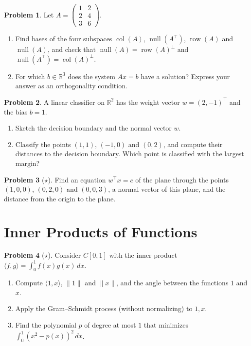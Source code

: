 \documentclass[11pt]{article}
\theoremstyle{definition}
\newtheorem{problem}{Problem}[section]
\newcommand{\norm}[1]{\lVert #1 \rVert}
\newcommand{\ip}[2]{\langle #1, #2 \rangle}
\DeclareMathOperator{\Null}{null}
\DeclareMathOperator{\col}{col}
\DeclareMathOperator{\row}{row}
\begin{document}
\begin{problem}\label{pr:four-subspaces}
    Let $A = \begin{pmatrix} 1 & 2 \\ 2 & 4 \\ 3 & 6 \end{pmatrix}$.
    \begin{enumerate}[label=(\alph*)]
        \item Find bases of the four subspaces $\col(A)$, $\Null(A^\top)$, $\row(A)$ and $\Null(A)$, and check that $\Null(A) = \row(A)^\perp$ and $\Null(A^\top) = \col(A)^\perp$.
        \item For which $b \in \mathbb{R}^3$ does the system $Ax = b$ have a solution? Express your answer as an orthogonality condition.
    \end{enumerate}
\end{problem}

\begin{problem}\label{pr:classifier}
    A linear classifier on $\mathbb{R}^2$ has the weight vector $w = (2, -1)^\top$ and the bias $b = 1$.
    \begin{enumerate}[label=(\alph*)]
        \item Sketch the decision boundary and the normal vector $w$.
        \item Classify the points $(1, 1)$, $(-1, 0)$ and $(0, 2)$, and compute their distances to the decision boundary. Which point is classified with the largest margin?
    \end{enumerate}
\end{problem}

\begin{problem}[$\star$]\label{pr:hyperplane-form}
    Find an equation $w^\top x = c$ of the plane through the points $(1, 0, 0)$, $(0, 2, 0)$ and $(0, 0, 3)$, a normal vector of this plane, and the distance from the origin to the plane.
\end{problem}

\section{Inner Products of Functions}

\begin{problem}[$\star$]\label{pr:func-ip}
    Consider $C[0, 1]$ with the inner product $\ip{f}{g} = \int_0^1 f(x) g(x) \, dx$.
    \begin{enumerate}[label=(\alph*)]
        \item Compute $\ip{1}{x}$, $\norm{1}$ and $\norm{x}$, and the angle between the functions $1$ and $x$.
        \item Apply the Gram--Schmidt process (without normalizing) to $1, x$.
        \item Find the polynomial $p$ of degree at most $1$ that minimizes $\int_0^1 (x^2 - p(x))^2 \, dx$.
    \end{enumerate}
\end{problem}
\end{document}
